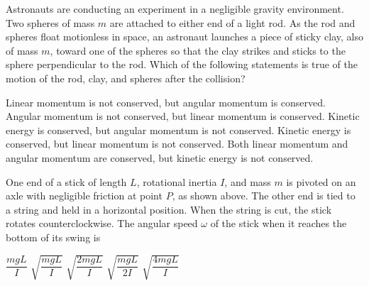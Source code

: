\documentclass{../../oss-apphys-exam}
\begin{document}
\begin{questions}
  \question Astronauts are conducting an experiment in a negligible gravity
  environment. Two spheres of mass $m$ are attached to either end of a light
  rod. As the rod and spheres float motionless in space, an astronaut launches
  a piece of sticky clay, also of mass $m$, toward one of the spheres so that
  the clay strikes and sticks to the sphere perpendicular to the rod. Which of
  the following statements is true of the motion of the rod, clay, and spheres
  after the collision?
  \begin{center}
  \end{center}
  \begin{choices}
    \choice Linear momentum is not conserved, but angular momentum is
    conserved.
    \choice Angular momentum is not conserved, but linear momentum is
    conserved.
    \choice Kinetic energy is conserved, but angular momentum is not
    conserved.
    \choice Kinetic energy is conserved, but linear momentum is not
    conserved.
    \choice Both linear momentum and angular momentum are conserved, but
    kinetic energy is not conserved.
  \end{choices}
  \newpage

  \question One end of a stick of length $L$, rotational inertia $I$, and mass
  $m$ is pivoted on an axle with negligible friction at point $P$, as shown
  above. The other end is tied to a string and held in a horizontal position.
  When the string is cut, the stick rotates counterclockwise. The angular speed
  $\omega$ of the stick when it reaches the bottom of its swing is
  \begin{choices}
    \choice$\dfrac{mgL}I$
    \choice$\sqrt{\dfrac{mgL}I}$
    \choice$\sqrt{\dfrac{2mgL}I}$
    \choice$\sqrt{\dfrac{mgL}{2I}}$
    \choice$\sqrt{\dfrac{4mgL}I}$
  \end{choices}
  

\end{questions}
\end{document}
